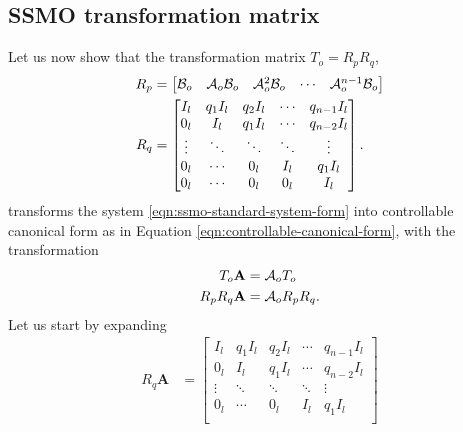 \begin{appendices}
\section{SSMO transformation matrix}\label{ap:ssmo-transformation-matrix}
Let us now show that the transformation matrix $T_o=R_pR_q$,
\begin{equation*}
    \begin{split}
         R_p &=
        \begin{bmatrix}
            \mathcal{B}_o & \mathcal{A}_o\mathcal{B}_o & \mathcal{A}^{2}_o\mathcal{B}_o & \cdots & \mathcal{A}^{n-1}_o\mathcal{B}_o \\
        \end{bmatrix} \\
        R_q &=
        \begin{bmatrix}
            I_l & q_1I_l & q_2I_l & \cdots & q_{n-1}I_l \\
            0_l & I_l & q_1I_l & \cdots & q_{n-2}I_l \\
            \vdots & \ddots & \ddots & \ddots & \vdots \\
            0_l & \cdots & 0_l & I_l & q_1I_l \\
            0_l & \cdots & 0_l & 0_l & I_l \\
        \end{bmatrix}.
    \end{split}
\end{equation*}
transforms the system \eqref{eqn:ssmo-standard-system-form} into controllable canonical form as in Equation \eqref{eqn:controllable-canonical-form}, with the transformation
\begin{equation}\label{eqn:A-transformation}
    \begin{split}
        T_o\mathbf{A} &= \mathcal{A}_oT_o \\
        R_pR_q\mathbf{A} &= \mathcal{A}_oR_pR_q. \\
    \end{split}
\end{equation}
 Let us start by expanding
\begin{equation*}
    \begin{split}
        R_q\mathbf{A} &=  
        \begin{bmatrix}
            I_l & q_1I_l & q_2I_l & \cdots & q_{n-1}I_l \\
            0_l & I_l & q_1I_l & \cdots & q_{n-2}I_l \\
            \vdots & \ddots & \ddots & \ddots & \vdots \\
            0_l & \cdots & 0_l & I_l & q_1I_l \\

\end{bmatrix}
\end{split}
\end{equation*}
\end{appendices}
